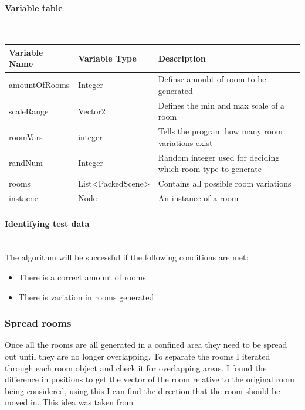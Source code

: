 \documentclass{article}
\newcommand{\myparagraph}[1]{\paragraph{#1}\mbox{}\\} %
\newcommand{\smallBr}{\vspace{1.5mm}}
\begin{document}
\myparagraph{Variable table} 
\smallBr
\begin{tabular}{l|l|l}
\multicolumn{1}{l|}{Variable Name} & Variable Type                            & \multicolumn{1}{|l}{Description}                             \\ \hline
amountOfRooms                       & Integer                                  & Definse amoubt of room to be generated                       \\
scaleRange                          & Vector2                                  & Defines the min and max scale of a room                      \\
roomVars                            & integer                                  & Tells the program how many room variations exist             \\
randNum                             & Integer                                  & Random integer used for deciding which room type to generate \\
rooms                               & List\textless{}PackedScene\textgreater{} & Contains all possible room variations                        \\
instacne                            & Node                                     & An instance of a room                                       
\end{tabular}

\myparagraph{Identifying test data}
The algorithm will be successful if the following conditions are met:
\begin{itemize}
\item{There is a correct amount of rooms}
\item{There is variation in rooms generated}
\end{itemize}

\subsubsection{Spread rooms}
Once all the rooms are all generated in a confined area they need to be spread out until they are no longer overlapping. To separate the rooms I iterated through each room object and check it for overlapping areas. I found the difference in positions to get the vector of the room relative to the original room being considered, using this I can find the direction that the room should be moved in. This idea was taken from \cite{Dis_Alg}
\end{document}
